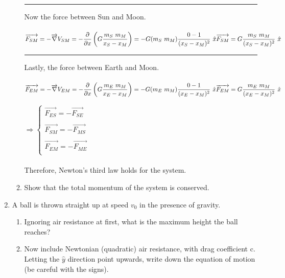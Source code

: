\documentclass[fleqn]{article}
\begin{document}
\begin{enumerate}
\begin{enumerate}
      \textcolor{hwColor}{
        \rule{15cm}{1pt}
      }

      \textcolor{hwColor}{
        Now the force between Sun and Moon. \\ \\
        $
          \overrightarrow{F_{SM}}=-\overrightarrow{\nabla}V_{SM}=-\dfrac{\partial}{\partial x}\left(G\dfrac{m_S ~ m_M}{x_S-x_M}\right)=-G(m_S ~ m_M)\dfrac{0-1}{(x_S-x_M)^2} ~ \hat{x} \\
          \\
          \overrightarrow{F_{SM}}=G\dfrac{m_S ~ m_M}{(x_S-x_M)^2} ~ \hat{x} \\
        $
      }

      \textcolor{hwColor}{
        \rule{15cm}{1pt}
      }

      \textcolor{hwColor}{
        Lastly, the force between Earth and Moon. \\ \\
        $
          \overrightarrow{F_{EM}}=-\overrightarrow{\nabla}V_{EM}=-\dfrac{\partial}{\partial x}\left(G\dfrac{m_E ~ m_M}{x_E-x_M}\right)=-G(m_E ~ m_M)\dfrac{0-1}{(x_E-x_M)^2} ~ \hat{x} \\
          \\
          \overrightarrow{F_{EM}}=G\dfrac{m_E ~ m_M}{(x_E-x_M)^2} ~ \hat{x} \\
        $
      }


      \textcolor{hwColor}{
        $
          \Longrightarrow \begin{cases}
            \overrightarrow{F_{ES}}=-\overrightarrow{F_{SE}} \\
            \\
            \overrightarrow{F_{SM}}=-\overrightarrow{F_{MS}} \\
            \\
            \overrightarrow{F_{EM}}=-\overrightarrow{F_{ME}} \\
          \end{cases}
        $
        \\
        \\
        Therefore, Newton’s third law holds for the system.
      }


      \item Show that the total momentum of the system is conserved.
    \end{enumerate}

    \item A ball is thrown straight up at speed $v_0$ in the presence of gravity.
    \begin{enumerate}
      \item Ignoring air resistance at first, what is the maximum height the
      ball reaches?
      \item Now include Newtonian (quadratic) air resistance, with drag coefficient c. Letting the $\hat{y}$ direction point upwards, write down the
      equation of motion (be careful with the signs).


\end{enumerate}
\end{enumerate}
\end{document}
